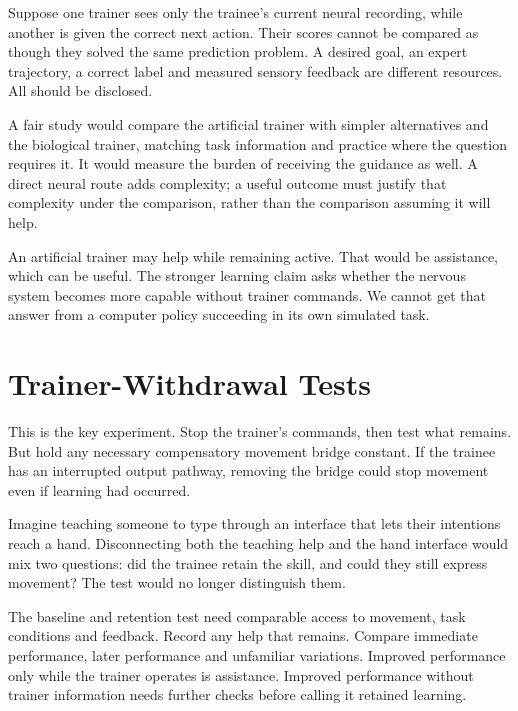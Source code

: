 Suppose one trainer sees only the trainee's current neural recording, while another is given the correct next action. Their scores cannot be compared as though they solved the same prediction problem. A desired goal, an expert trajectory, a correct label and measured sensory feedback are different resources. All should be disclosed.\par

A fair study would compare the artificial trainer with simpler alternatives and the biological trainer, matching task information and practice where the question requires it. It would measure the burden of receiving the guidance as well. A direct neural route adds complexity; a useful outcome must justify that complexity under the comparison, rather than the comparison assuming it will help.\par

An artificial trainer may help while remaining active. That would be assistance, which can be useful. The stronger learning claim asks whether the nervous system becomes more capable without trainer commands. We cannot get that answer from a computer policy succeeding in its own simulated task.\par

\section{Trainer-Withdrawal Tests}

This is the key experiment. Stop the trainer's commands, then test what remains. But hold any necessary compensatory movement bridge constant. If the trainee has an interrupted output pathway, removing the bridge could stop movement even if learning had occurred.\par

Imagine teaching someone to type through an interface that lets their intentions reach a hand. Disconnecting both the teaching help and the hand interface would mix two questions: did the trainee retain the skill, and could they still express movement? The test would no longer distinguish them.\par

The baseline and retention test need comparable access to movement, task conditions and feedback. Record any help that remains. Compare immediate performance, later performance and unfamiliar variations. Improved performance only while the trainer operates is assistance. Improved performance without trainer information needs further checks before calling it retained learning.\par

